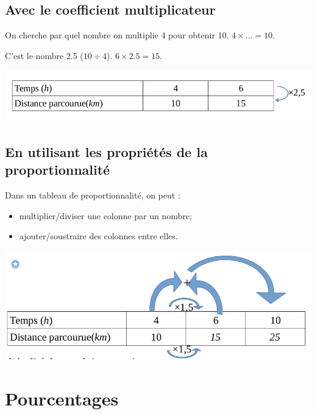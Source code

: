 \documentclass[12pt,a4paper]{article}
\begin{document}
\subsection{Avec le coefficient multiplicateur}

\begin{mymeth}
	On cherche par quel nombre on multiplie 4 pour obtenir 10. $4 \times ...= 10$.
	
	C’est le nombre \num{2.5} ($10 \div 4$). $6 \times \num{2.5} = 15$.
	
	
	\begin{center}
		\includegraphics[scale=0.5]{tab3_3}
	\end{center}
\end{mymeth}


\subsection{En utilisant les propriétés de la proportionnalité}

\begin{myprop}
	Dans un tableau de proportionnalité, on peut :
		\begin{itemize}
			\item multiplier/diviser une colonne par un nombre;
			\item ajouter/soustraire des colonnes entre elles.
		\end{itemize}
	
	\begin{center}
		\includegraphics[scale=0.5]{tab3_4}
	\end{center}
\end{myprop}

\newpage

\section{Pourcentages}
\end{document}
